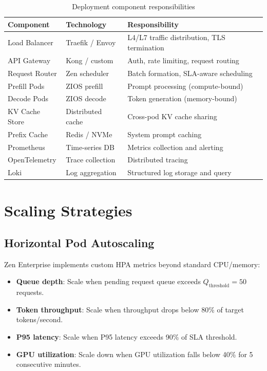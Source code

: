 \documentclass[11pt,a4paper]{article}
\begin{document}
\begin{table}[H]
\centering
\caption{Deployment component responsibilities}
\label{tab:components}
\begin{tabular}{lll}
\toprule
Component & Technology & Responsibility \\
\midrule
Load Balancer & Traefik / Envoy & L4/L7 traffic distribution, TLS termination \\
API Gateway & Kong / custom & Auth, rate limiting, request routing \\
Request Router & Zen scheduler & Batch formation, SLA-aware scheduling \\
Prefill Pods & ZIOS prefill & Prompt processing (compute-bound) \\
Decode Pods & ZIOS decode & Token generation (memory-bound) \\
KV Cache Store & Distributed cache & Cross-pod KV cache sharing \\
Prefix Cache & Redis / NVMe & System prompt caching \\
Prometheus & Time-series DB & Metrics collection and alerting \\
OpenTelemetry & Trace collection & Distributed tracing \\
Loki & Log aggregation & Structured log storage and query \\
\bottomrule
\end{tabular}
\end{table}

\section{Scaling Strategies}

\subsection{Horizontal Pod Autoscaling}

Zen Enterprise implements custom HPA metrics beyond standard CPU/memory:

\begin{itemize}
  \item \textbf{Queue depth}: Scale when pending request queue exceeds $Q_{\text{threshold}} = 50$ requests.
  \item \textbf{Token throughput}: Scale when throughput drops below 80\% of target tokens/second.
  \item \textbf{P95 latency}: Scale when P95 latency exceeds 90\% of SLA threshold.
  \item \textbf{GPU utilization}: Scale down when GPU utilization falls below 40\% for 5 consecutive minutes.
\end{itemize}
\end{document}
